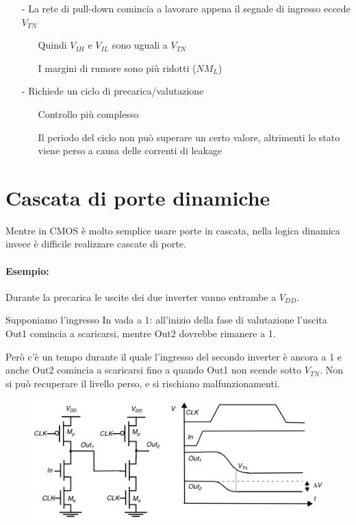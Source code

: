 \begin{itemize}
    \item[-]  La	rete	di	pull-down	comincia a	lavorare appena il segnale di	ingresso eccede $V_{TN}$
     \begin{itemize}
         \item[] Quindi $V_{IH}$ e	$V_{IL}$ sono uguali a	$V_{TN}$
         \item[] I	margini di	rumore sono più ridotti ($NM_L$)
     \end{itemize}
\end{itemize}

 \begin{itemize}
     \item[-] Richiede un	ciclo di	precarica/valutazione
      \begin{itemize}
          \item[] Controllo	più	complesso
          \item[] Il	periodo	del	ciclo	non	può	superare	un	certo	valore,	altrimenti	lo	stato	viene	perso	a	causa	delle	correnti	di	leakage
      \end{itemize}
 \end{itemize}

\section{Cascata di porte dinamiche}

 Mentre in CMOS è molto semplice usare porte in cascata, nella logica dinamica invece è difficile	realizzare cascate di	porte.
 \paragraph{Esempio:} Durante	la	precarica le	uscite dei due	inverter	vanno entrambe a	$V_{DD}$. 

 
 Supponiamo l'ingresso In vada a	1: all'inizio della fase di	valutazione l'uscita Out1 comincia a	scaricarsi, mentre Out2 dovrebbe rimanere a	1.

 
 Però c'è un	tempo	durante il quale	l'ingresso del	secondo	inverter	è ancora a	1 e anche Out2 comincia a	scaricarsi
fino a	quando Out1 non	scende sotto	$V_{TN}$. 
 Non	si può recuperare il livello
perso,	e	si rischiano
malfunzionamenti.

\begin{figure}[htbp]
    \centering
    \includegraphics[width=0.6\linewidth]{img/es_cascata.png}    
    
\end{figure}

